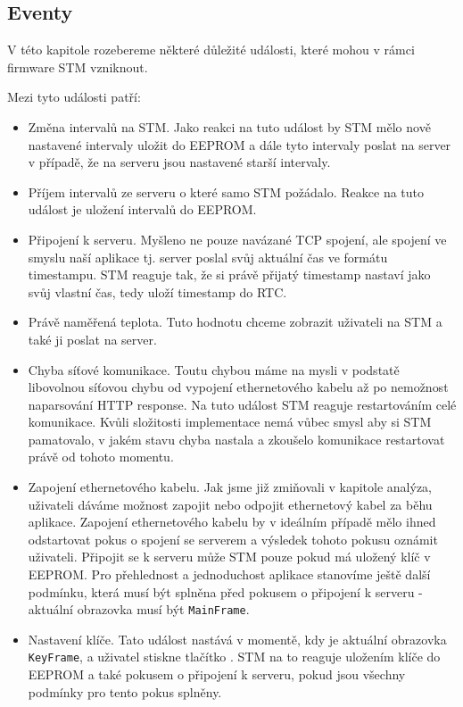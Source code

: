 
\subsection{Eventy}
V této kapitole rozebereme některé důležité události, které mohou v rámci firmware STM vzniknout.

Mezi tyto události patří:
\begin{itemize}
  \item Změna intervalů na STM.
    Jako reakci na tuto událost by STM mělo nově nastavené intervaly uložit do EEPROM a dále
    tyto intervaly poslat na server v případě, že na serveru jsou nastavené starší intervaly.

  \item Příjem intervalů ze serveru o které samo STM požádalo. Reakce na tuto událost je
    uložení intervalů do EEPROM.

  \item Připojení k serveru. Myšleno ne pouze navázané TCP spojení, ale spojení ve smyslu naší
    aplikace tj. server poslal svůj aktuální čas ve formátu timestampu.
    STM reaguje tak, že si právě přijatý timestamp nastaví jako svůj vlastní čas, tedy
    uloží timestamp do RTC.

  \item Právě naměřená teplota. Tuto hodnotu chceme zobrazit uživateli na STM a také ji poslat
    na server.

  \item Chyba síťové komunikace. Toutu chybou máme na mysli v podstatě libovolnou síťovou chybu
    od vypojení ethernetového kabelu až po nemožnost naparsování HTTP response.
    Na tuto událost STM reaguje restartováním celé komunikace.
    Kvůli složitosti implementace nemá vůbec smysl aby si STM pamatovalo, v jakém stavu chyba
    nastala a zkoušelo komunikace restartovat právě od tohoto momentu.

  \item Zapojení ethernetového kabelu. Jak jsme již zmiňovali v kapitole analýza, uživateli
    dáváme možnost zapojit nebo odpojit ethernetový kabel za běhu aplikace.
    Zapojení ethernetového kabelu by v ideálním případě mělo ihned odstartovat pokus o spojení se serverem
    a výsledek tohoto pokusu oznámit uživateli.
    Připojit se k serveru může STM pouze pokud má uložený klíč v EEPROM.
    Pro přehlednost a jednoduchost aplikace stanovíme ještě další podmínku, která musí být splněna
    před pokusem o připojení k serveru - aktuální obrazovka musí být \texttt{MainFrame}.

  \item Nastavení klíče. Tato událost nastává v momentě, kdy je aktuální obrazovka \texttt{KeyFrame},
    a uživatel stiskne tlačítko .
    STM na to reaguje uložením klíče do EEPROM a také pokusem o připojení k serveru,
    pokud jsou všechny podmínky pro tento pokus splněny.
\end{itemize}

